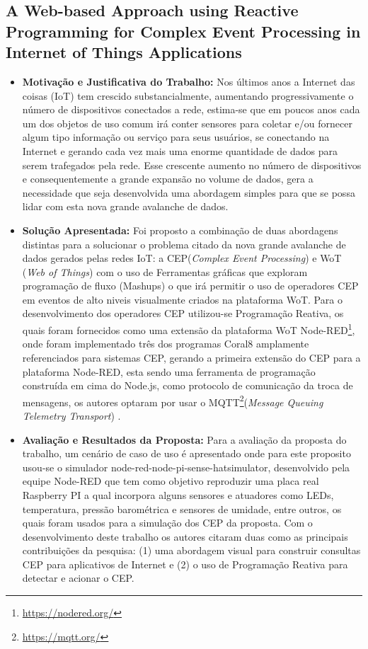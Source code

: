 \documentclass[tid,table]{texufpel} %
\begin{document}
\subsection{A Web-based Approach using Reactive Programming for Complex Event Processing in Internet of Things Applications}

\begin{itemize}
	\item \textbf{Motivação e Justificativa do Trabalho:} Nos últimos anos a Internet das coisas (IoT) tem crescido substancialmente, aumentando progressivamente o número de dispositivos conectados a rede, estima-se que em poucos anos cada um dos objetos de uso comum irá conter sensores para coletar e/ou fornecer algum tipo informação ou serviço para seus usuários, se conectando na Internet e gerando cada vez mais uma enorme quantidade de dados para serem trafegados pela rede. Esse crescente aumento no número de dispositivos e consequentemente a grande expansão no volume de dados, gera a necessidade que seja desenvolvida uma abordagem simples para que se possa lidar com esta nova grande avalanche de dados.
	
	\item \textbf{Solução Apresentada:}  Foi proposto a combinação de duas abordagens distintas para a solucionar o problema citado da nova grande avalanche de dados gerados pelas redes IoT: a CEP(\textit{Complex Event Processing}) e WoT (\textit{Web of Things}) com o uso de Ferramentas gráficas que exploram programação de fluxo (Mashups) o que irá permitir o uso de operadores CEP em eventos de alto niveis visualmente criados na plataforma WoT.
	Para o desenvolvimento dos operadores CEP utilizou-se Programação Reativa, os quais foram fornecidos como uma extensão da plataforma WoT Node-RED\footnote{\url{https://nodered.org/}}, onde foram implementado três dos programas Coral8 amplamente referenciados para sistemas CEP, gerando a primeira extensão do CEP para a plataforma Node-RED, esta sendo uma ferramenta de programação construída em cima do Node.js, como protocolo de comunicação da troca de mensagens, os autores optaram por usar o MQTT\footnote{\url{https://mqtt.org/}}(\textit{Message Queuing Telemetry Transport}) . 	
	
	\item \textbf{Avaliação e Resultados da Proposta:} Para a avaliação da proposta do trabalho, um cenário de caso de uso é apresentado onde para este proposito usou-se o simulador node-red-node-pi-sense-hatsimulator, desenvolvido pela equipe Node-RED que tem como objetivo reproduzir uma placa real Raspberry PI a qual incorpora alguns sensores e atuadores como LEDs, temperatura, pressão barométrica e sensores de umidade, entre outros, os quais foram usados para a simulação dos CEP da proposta. Com o desenvolvimento deste trabalho os autores citaram duas como as principais contribuições da pesquisa: (1) uma abordagem visual para construir consultas CEP para aplicativos de Internet e (2) o uso de Programação Reativa para detectar e acionar o CEP.
	
\end{itemize}
\end{document}
